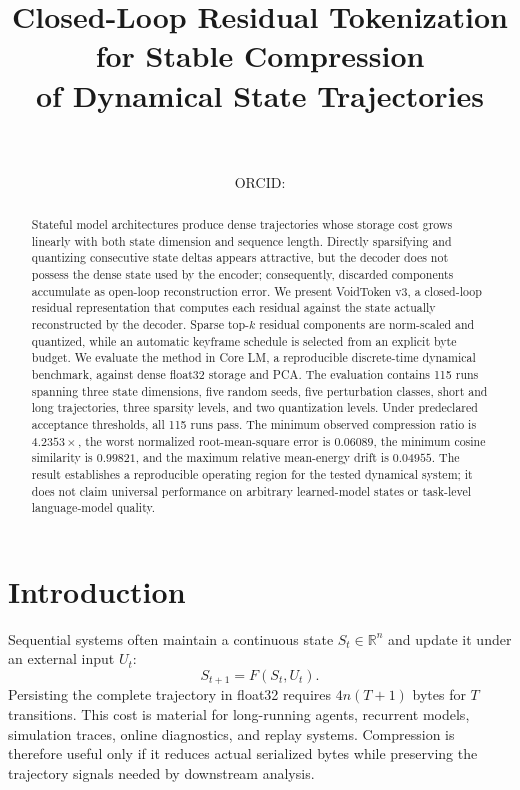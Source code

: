 \documentclass[10pt]{article}
\title{\textbf{Closed-Loop Residual Tokenization for Stable Compression\\
of Dynamical State Trajectories}}
\author{\PaperAuthor\\
  \small \PaperAffiliation\\
  \small ORCID: \href{https://orcid.org/\PaperORCID}{\PaperORCID}}
\date{}
\newcommand{\R}{\mathbb{R}}
\begin{document}
\maketitle

\begin{abstract}
Stateful model architectures produce dense trajectories whose storage cost grows
linearly with both state dimension and sequence length. Directly sparsifying and
quantizing consecutive state deltas appears attractive, but the decoder does not
possess the dense state used by the encoder; consequently, discarded components
accumulate as open-loop reconstruction error. We present VoidToken v3, a
closed-loop residual representation that computes each residual against the
state actually reconstructed by the decoder. Sparse top-$k$ residual components
are norm-scaled and quantized, while an automatic keyframe schedule is selected
from an explicit byte budget. We evaluate the method in Core LM, a reproducible
discrete-time dynamical benchmark, against dense float32 storage and PCA. The
evaluation contains 115 runs spanning three state dimensions, five random seeds,
five perturbation classes, short and long trajectories, three sparsity levels,
and two quantization levels. Under predeclared acceptance thresholds, all
115 runs pass. The minimum observed compression ratio is $4.2353\times$, the
worst normalized root-mean-square error is $0.06089$, the minimum cosine
similarity is $0.99821$, and the maximum relative mean-energy drift is $0.04955$.
The result establishes a reproducible operating region for the tested dynamical
system; it does not claim universal performance on arbitrary learned-model
states or task-level language-model quality.
\end{abstract}

\section{Introduction}

Sequential systems often maintain a continuous state
$S_t\in\R^n$ and update it under an external input $U_t$:
\begin{equation}
  S_{t+1}=F(S_t,U_t).
  \label{eq:dynamics}
\end{equation}
Persisting the complete trajectory in float32 requires
$4n(T+1)$ bytes for $T$ transitions. This cost is material for long-running
agents, recurrent models, simulation traces, online diagnostics, and replay
systems. Compression is therefore useful only if it reduces actual serialized
bytes while preserving the trajectory signals needed by downstream analysis.
\end{document}
